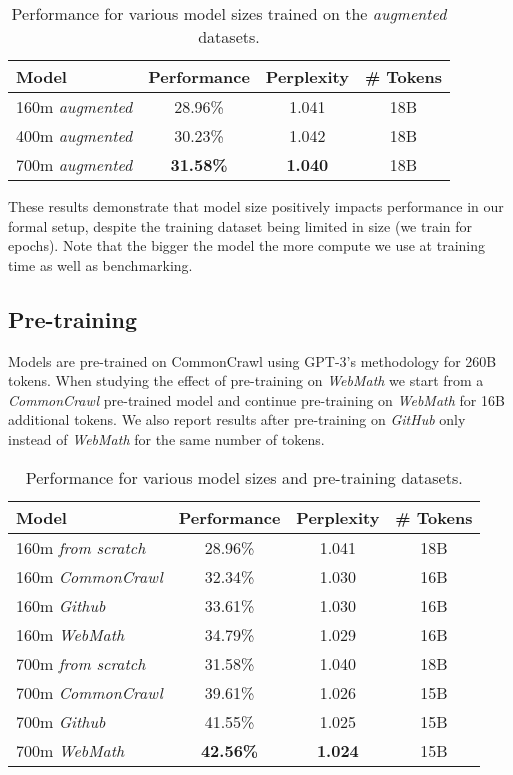 \documentclass{article}
\begin{document}
\begin{table}[ht]
\caption{Performance for various model sizes trained on the \textit{augmented} datasets.} 
\centering
\begin{tabular}{ |l|c|c|c| }
    \hline
    Model & Performance & Perplexity & \# Tokens \\
    \hline
    160m \textit{augmented} & 28.96\% & 1.041 & 18B \\
    400m \textit{augmented} & 30.23\% & 1.042 & 18B \\
    700m \textit{augmented} & \textbf{31.58\%} & \textbf{1.040} & 18B \\
    \hline
\end{tabular}
\label{table:modelsize}
\end{table}
    
These results demonstrate that model size positively impacts performance in our formal setup, despite the training dataset being limited in size (we train for  epochs). Note that the bigger the model the more compute we use at training time as well as benchmarking.

\subsection{Pre-training}

Models are pre-trained on CommonCrawl using GPT-3's\cite{brown2020language} methodology for 260B tokens. When studying the effect of pre-training on \textit{WebMath} we start from a \textit{CommonCrawl} pre-trained model and continue pre-training on \textit{WebMath} for 16B additional tokens. We also report results after pre-training on \textit{GitHub} only instead of \textit{WebMath} for the same number of tokens.  

\begin{table}[ht]
\caption{Performance for various model sizes and pre-training datasets.} 
\centering
\begin{tabular}{ |l|c|c|c| }
    \hline
    Model & Performance & Perplexity & \# Tokens \\
    \hline
    160m \textit{from scratch} & 28.96\% & 1.041 & 18B \\
    160m \textit{CommonCrawl} & 32.34\% &  1.030 & 16B \\
    160m \textit{Github} & 33.61\% & 1.030 & 16B \\
    160m \textit{WebMath} & 34.79\% & 1.029 & 16B \\
    700m \textit{from scratch} & 31.58\% & 1.040 & 18B \\
    700m \textit{CommonCrawl} & 39.61\% & 1.026 & 15B \\
    700m \textit{Github} & 41.55\% & 1.025 & 15B \\
    700m \textit{WebMath} & \textbf{42.56\%} & \textbf{1.024} & 15B \\
    \hline
\end{tabular}
\label{table:pretrain}
\end{table}
\end{document}
